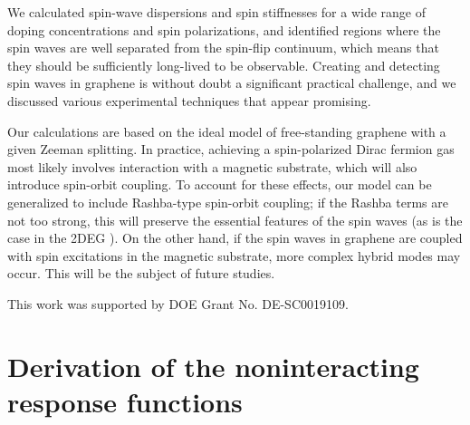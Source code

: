 \documentclass[aps,prb,twocolumn,superscriptaddress]{revtex4-2}
\begin{document}
We calculated spin-wave dispersions and spin stiffnesses for a wide range of doping concentrations and spin polarizations,
and identified regions where the spin waves are well separated from the spin-flip continuum, which means that they should be
sufficiently long-lived to be observable. Creating and detecting spin waves in graphene is without doubt a significant practical challenge,
and we discussed various experimental techniques that appear promising.

Our calculations are based on the ideal model of free-standing graphene with a given Zeeman splitting. In practice, achieving a
spin-polarized Dirac fermion gas most likely involves interaction with a magnetic substrate, which will also introduce spin-orbit coupling.
To account for these effects, our model can be generalized to include Rashba-type spin-orbit coupling; if the Rashba terms are not
too strong, this will preserve the essential features of the spin waves (as is the case in the 2DEG \cite{Baboux2012,Baboux2013,Perez2016,Karimi2017,DAmico2019}).
On the other hand, if the spin waves in graphene are coupled with spin excitations in the magnetic substrate, more complex hybrid modes
may occur. This will be the subject of future studies.



\acknowledgments

This work was supported by DOE Grant No. DE-SC0019109.

\appendix

\section{Derivation of the noninteracting response functions}\label{appA}
\end{document}
